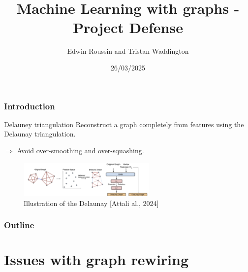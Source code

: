 \documentclass[10pt, aspectratio = 169]{beamer}
\title{Machine Learning with graphs - Project Defense}
\subtitle{Delaunay Graph: Addressing Over-Squashing and Over-Smoothing Using
Delaunay Triangulation\\
by Attali H., Duscaldi D. and Pernelle N. \texorpdfstring{\cite{attali2024delaunay}}}
\author{Edwin Roussin and Tristan Waddington}
\institute{IP-Paris, CEMST}
\date{26/03/2025}
\begin{document}
\begin{frame}
    \titlepage
\end{frame}

\begin{frame}
    \frametitle{Introduction}
    \begin{block}{Delauney triangulation}
    Reconstruct a graph completely from features using the Delaunay triangulation.

    $\Rightarrow$ Avoid over-smoothing and over-squashing.
    \end{block}
    
    \begin{figure}
        \includegraphics[width=0.6\textwidth]{figures/Delaunay-Rewiring.png}
        \caption{Illustration of the Delaunay [Attali al., 2024] \cite{attali2024delaunay}}
    \end{figure}
\end{frame}


\begin{frame}
    \frametitle{Outline}
    \tableofcontents
\end{frame}

\section{Issues with graph rewiring}
\end{document}
